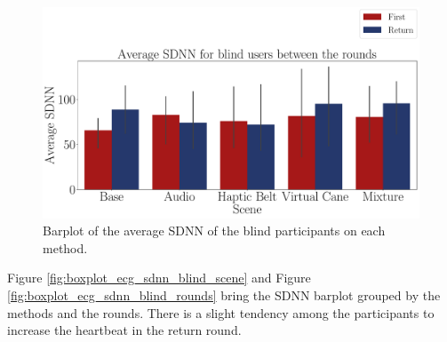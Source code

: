 \begin{figure}[!htb]
    \centering
    \includegraphics[width = \textwidth]{Resultados/ECG/Figuras/pdf/barplot_ecg_sdnn_5_scene_blind.pdf}
    \caption{Barplot of the average SDNN of the blind participants on each method.}
    \label{fig:barplot_ecg_sdnn_5_scene_blind}
\end{figure}

%
%

Figure \ref{fig:boxplot_ecg_sdnn_blind_scene} and Figure \ref{fig:boxplot_ecg_sdnn_blind_rounds} bring the SDNN barplot grouped by the methods and the rounds. There is a slight tendency among the participants to increase the heartbeat in the return round.

